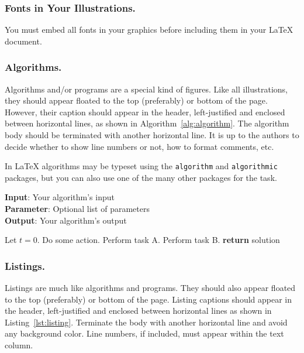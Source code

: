 \subsubsection{Fonts in Your Illustrations.}
You must embed all fonts in your graphics before including them in your LaTeX document.

\subsubsection{Algorithms.}
Algorithms and/or programs are a special kind of figures. Like all illustrations, they should appear floated to the top (preferably) or bottom of the page. However, their caption should appear in the header, left-justified and enclosed between horizontal lines, as shown in Algorithm~\ref{alg:algorithm}. The algorithm body should be terminated with another horizontal line. It is up to the authors to decide whether to show line numbers or not, how to format comments, etc.

In \LaTeX{} algorithms may be typeset using the {\tt algorithm} and {\tt algorithmic} packages, but you can also use one of the many other packages for the task.

\begin{algorithm}[tb]
\caption{Example algorithm}
\label{alg:algorithm}
\textbf{Input}: Your algorithm's input\\
\textbf{Parameter}: Optional list of parameters\\
\textbf{Output}: Your algorithm's output
\begin{algorithmic}[1] %
\STATE Let $t=0$.
\STATE Do some action.
\STATE Perform task A.
\ELSE
\STATE Perform task B.
\ENDIF
\ENDWHILE
\STATE \textbf{return} solution
\end{algorithmic}
\end{algorithm}

\subsubsection{Listings.}
Listings are much like algorithms and programs. They should also appear floated to the top (preferably) or bottom of the page. Listing captions should appear in the header, left-justified and enclosed between horizontal lines as shown in Listing~\ref{lst:listing}. Terminate the body with another horizontal line and avoid any background color. Line numbers, if included, must appear within the text column.

